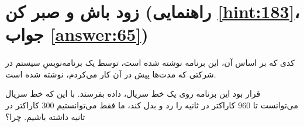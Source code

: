 \section[زود باش و صبر کن]{زود باش و صبر کن \protect{} (راهنمایی \ref{hint:183}، جواب \ref{answer:65})}
\paragraph{}\label{prog:12}
کدی که بر اساس آن، این برنامه نوشته شده است، توسط یک برنامه‌نویسِ سیستم در شرکتی که مدت‌ها پیش در آن کار می‌کردم، نوشته شده است.

قرار بود این برنامه روی یک خط سریال، داده بفرستد. با این که خط سریال می‌توانست تا 960 کاراکتر در ثانیه را رد و بدل کند، ما فقط می‌توانستیم 300 کاراکتر در ثانیه داشته باشیم. چرا؟


